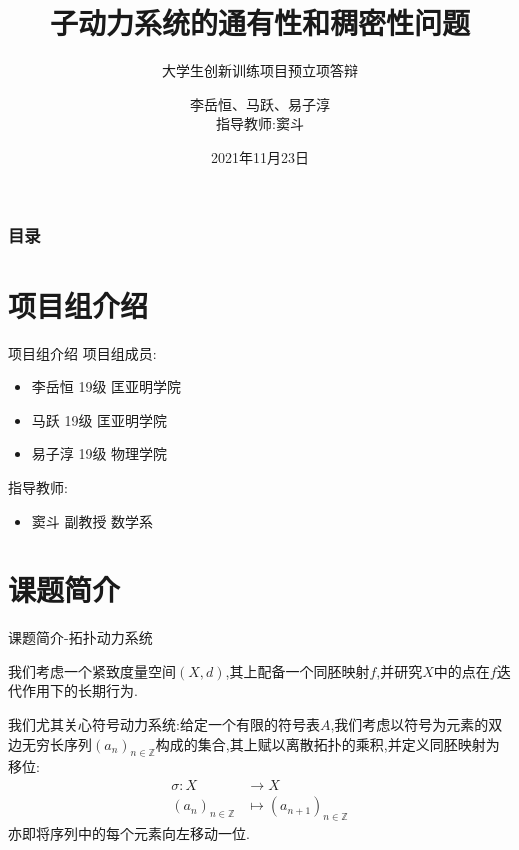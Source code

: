\documentclass[11pt]{beamer}                                                                                                                 \usetheme{Madrid}
\begin{document}
\begin{CJK}{UTF8}{gbsn}



    \title[拓扑动力系统的通有性和稠密性问题]{子动力系统的通有性和稠密性问题} %
    \subtitle{大学生创新训练项目预立项答辩}
    \author{李岳恒、马跃、易子淳\\
    指导教师:窦斗}
    
	
    \date{2021年11月23日}  %

    \begin{frame}
        \titlepage
    \end{frame}
	
	\begin{frame}
		\frametitle{目录}
		\tableofcontents
	\end{frame}


\section{项目组介绍}

	\begin{frame}{项目组介绍}
	项目组成员:
		\begin{itemize}
			\item 李岳恒 19级 匡亚明学院
			\item 马跃 \hspace{2ex}19级 匡亚明学院
			\item 易子淳 19级 物理学院
		\end{itemize}
	指导教师:
		\begin{itemize}
			\item 窦斗 副教授 数学系
		\end{itemize}
	\end{frame}


\section{课题简介}

	\begin{frame}{课题简介-拓扑动力系统}
		\begin{definition}[拓扑动力系统]
		我们考虑一个紧致度量空间$(X,d)$,其上配备一个同胚映射$f$,并研究$X$中的点在$f$迭代作用下的长期行为.
		\end{definition}
		
		
			\begin{definition}[符号动力系统]
			我们尤其关心符号动力系统:给定一个有限的符号表$A$,我们考虑以符号为元素的双边无穷长序列$(a_n)_{n\in\mathbb{Z}}$构成的集合,其上赋以离散拓扑的乘积,并定义同胚映射为移位:
			\begin{align*}
				\sigma:X &\rightarrow X \\
				(a_n)_{n\in\mathbb{Z}} &\mapsto (a_{n+1})_{n\in\mathbb{Z}}
			\end{align*}
			亦即将序列中的每个元素向左移动一位.
		\end{definition}
		

\end{frame}
\end{CJK}
\end{document}
